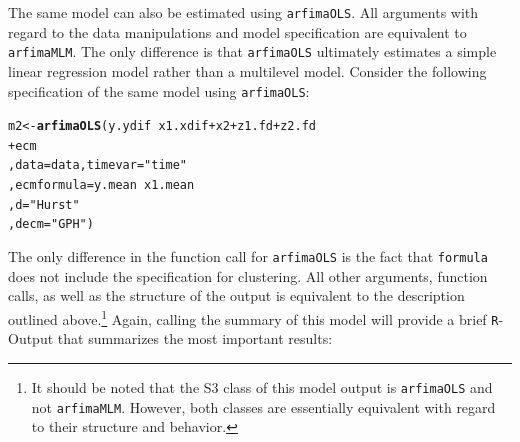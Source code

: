 \documentclass[12pt]{paper}\usepackage[]{graphicx}\usepackage[]{color}
\makeatletter
\newcommand{\hlstr}[1]{\textcolor[rgb]{0.192,0.494,0.8}{#1}}%
\newcommand{\hlopt}[1]{\textcolor[rgb]{0,0,0}{#1}}%
\newcommand{\hlstd}[1]{\textcolor[rgb]{0.345,0.345,0.345}{#1}}%
\newcommand{\hlkwb}[1]{\textcolor[rgb]{0.69,0.353,0.396}{#1}}%
\newcommand{\hlkwc}[1]{\textcolor[rgb]{0.333,0.667,0.333}{#1}}%
\newcommand{\hlkwd}[1]{\textcolor[rgb]{0.737,0.353,0.396}{\textbf{#1}}}%
\newenvironment{kframe}{%
 \def\at@end@of@kframe{}%
 \ifinner\ifhmode%
  \def\at@end@of@kframe{\end{minipage}}%
  \begin{minipage}{\columnwidth}%
 \fi\fi%
 \def\FrameCommand##1{\hskip\@totalleftmargin \hskip-\fboxsep
 \colorbox{shadecolor}{##1}\hskip-\fboxsep
     \hskip-\linewidth \hskip-\@totalleftmargin \hskip\columnwidth}%
 \MakeFramed {\advance\hsize-\width
   \@totalleftmargin\z@ \linewidth\hsize
   \@setminipage}}%
 {\par\unskip\endMakeFramed%
 \at@end@of@kframe}
\newenvironment{knitrout}{}{} %
\makeatother
\begin{document}
The same model can also be estimated using \texttt{arfimaOLS}. All arguments with regard to the data manipulations and model specification are equivalent to \texttt{arfimaMLM}. The only difference is that \texttt{arfimaOLS} ultimately estimates a simple linear regression model rather than a multilevel model. Consider the following specification of the same model using \texttt{arfimaOLS}:

\begin{knitrout}
\color{fgcolor}\begin{kframe}
\begin{alltt}
\hlstd{m2} \hlkwb{<-} \hlkwd{arfimaOLS}\hlstd{(y.ydif} \hlopt{~} \hlstd{x1.xdif} \hlopt{+} \hlstd{x2} \hlopt{+} \hlstd{z1.fd} \hlopt{+} \hlstd{z2.fd}
                \hlopt{+} \hlstd{ecm}
                \hlstd{,} \hlkwc{data} \hlstd{= data,} \hlkwc{timevar} \hlstd{=} \hlstr{"time"}
                \hlstd{,} \hlkwc{ecmformula} \hlstd{= y.mean} \hlopt{~} \hlstd{x1.mean}
                \hlstd{,} \hlkwc{d} \hlstd{=} \hlstr{"Hurst"}
                \hlstd{,} \hlkwc{decm} \hlstd{=} \hlstr{"GPH"}\hlstd{)}
\end{alltt}
\end{kframe}
\end{knitrout}

The only difference in the function call for \texttt{arfimaOLS} is the fact that \texttt{formula} does not include the specification for clustering. All other arguments, function calls, as well as the structure of the output is equivalent to the description outlined above.\footnote{It should be noted that the S3 class of this model output is \texttt{arfimaOLS} and not \texttt{arfimaMLM}. However, both classes are essentially equivalent with regard to their structure and behavior.} Again, calling the summary of this model will provide a brief \texttt{R}-Output that summarizes the most important results:
\end{document}
